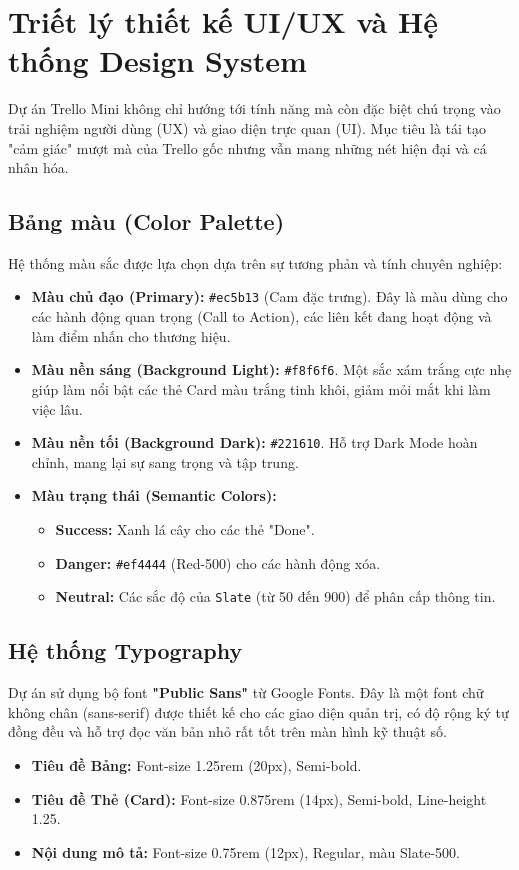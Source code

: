 \section{Triết lý thiết kế UI/UX và Hệ thống Design System}

Dự án Trello Mini không chỉ hướng tới tính năng mà còn đặc biệt chú trọng vào trải nghiệm người dùng (UX) và giao diện trực quan (UI). Mục tiêu là tái tạo "cảm giác" mượt mà của Trello gốc nhưng vẫn mang những nét hiện đại và cá nhân hóa.

\subsection{Bảng màu (Color Palette)}
Hệ thống màu sắc được lựa chọn dựa trên sự tương phản và tính chuyên nghiệp:
\begin{itemize}
    \item \textbf{Màu chủ đạo (Primary):} \texttt{\#ec5b13} (Cam đặc trưng). Đây là màu dùng cho các hành động quan trọng (Call to Action), các liên kết đang hoạt động và làm điểm nhấn cho thương hiệu.
    \item \textbf{Màu nền sáng (Background Light):} \texttt{\#f8f6f6}. Một sắc xám trắng cực nhẹ giúp làm nổi bật các thẻ Card màu trắng tinh khôi, giảm mỏi mắt khi làm việc lâu.
    \item \textbf{Màu nền tối (Background Dark):} \texttt{\#221610}. Hỗ trợ Dark Mode hoàn chỉnh, mang lại sự sang trọng và tập trung.
    \item \textbf{Màu trạng thái (Semantic Colors):}
        \begin{itemize}
            \item \textbf{Success:} Xanh lá cây cho các thẻ "Done".
            \item \textbf{Danger:} \texttt{\#ef4444} (Red-500) cho các hành động xóa.
            \item \textbf{Neutral:} Các sắc độ của \texttt{Slate} (từ 50 đến 900) để phân cấp thông tin.
        \end{itemize}
\end{itemize}

\subsection{Hệ thống Typography}
Dự án sử dụng bộ font \textbf{"Public Sans"} từ Google Fonts. Đây là một font chữ không chân (sans-serif) được thiết kế cho các giao diện quản trị, có độ rộng ký tự đồng đều và hỗ trợ đọc văn bản nhỏ rất tốt trên màn hình kỹ thuật số.
\begin{itemize}
    \item \textbf{Tiêu đề Bảng:} Font-size 1.25rem (20px), Semi-bold.
    \item \textbf{Tiêu đề Thẻ (Card):} Font-size 0.875rem (14px), Semi-bold, Line-height 1.25.
    \item \textbf{Nội dung mô tả:} Font-size 0.75rem (12px), Regular, màu Slate-500.
\end{itemize}

